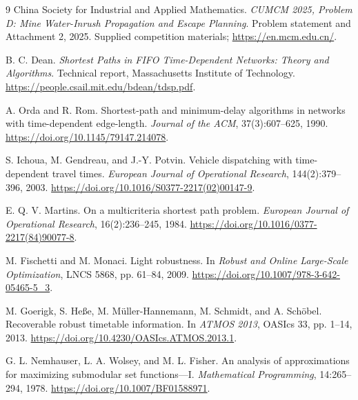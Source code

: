 \documentclass[11pt]{article}
\begin{document}
\begin{thebibliography}{9}
\small
\setlength{\itemsep}{3pt}
\setlength{\parskip}{0pt}
China Society for Industrial and Applied Mathematics.
\emph{CUMCM 2025, Problem D: Mine Water-Inrush Propagation and Escape Planning}.
Problem statement and Attachment 2, 2025. Supplied competition materials;
\url{https://en.mcm.edu.cn/}.

B. C. Dean.
\emph{Shortest Paths in FIFO Time-Dependent Networks: Theory and Algorithms}.
Technical report, Massachusetts Institute of Technology.
\url{https://people.csail.mit.edu/bdean/tdsp.pdf}.

A. Orda and R. Rom.
Shortest-path and minimum-delay algorithms in networks with time-dependent edge-length.
\emph{Journal of the ACM}, 37(3):607--625, 1990.
\url{https://doi.org/10.1145/79147.214078}.

S. Ichoua, M. Gendreau, and J.-Y. Potvin.
Vehicle dispatching with time-dependent travel times.
\emph{European Journal of Operational Research}, 144(2):379--396, 2003.
\url{https://doi.org/10.1016/S0377-2217(02)00147-9}.

E. Q. V. Martins.
On a multicriteria shortest path problem.
\emph{European Journal of Operational Research}, 16(2):236--245, 1984.
\url{https://doi.org/10.1016/0377-2217(84)90077-8}.

M. Fischetti and M. Monaci.
Light robustness.
In \emph{Robust and Online Large-Scale Optimization}, LNCS 5868, pp. 61--84, 2009.
\url{https://doi.org/10.1007/978-3-642-05465-5_3}.

M. Goerigk, S. He{\ss}e, M. M{\"u}ller-Hannemann, M. Schmidt, and A. Sch{\"o}bel.
Recoverable robust timetable information.
In \emph{ATMOS 2013}, OASIcs 33, pp. 1--14, 2013.
\url{https://doi.org/10.4230/OASIcs.ATMOS.2013.1}.

G. L. Nemhauser, L. A. Wolsey, and M. L. Fisher.
An analysis of approximations for maximizing submodular set functions---I.
\emph{Mathematical Programming}, 14:265--294, 1978.
\url{https://doi.org/10.1007/BF01588971}.
\end{thebibliography}
\end{document}
